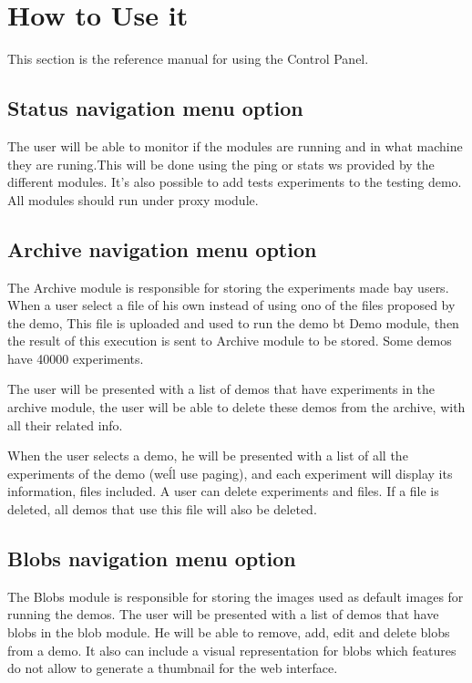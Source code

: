 \section{How to Use it}
This section is the reference manual for using the Control Panel.

\subsection{Status navigation menu option}
The user will be able to monitor if the modules are running and in what machine they are runing.This will be done using the ping or stats ws provided by the different modules.
It's also possible to add tests experiments to the testing demo.
All modules should run under proxy module.

\subsection{Archive navigation menu option}
The Archive module is responsible for storing the experiments made bay users. When a user select a file of his own instead of using ono of the files proposed by the demo, This file is uploaded and used to run the demo bt Demo module, then the result of this execution is sent to Archive module to be stored. Some demos have 40000 experiments.

The user will be presented with a list of demos that have experiments in the archive module, the user will be able to delete these demos from the archive, with all their related info.

When the user selects a demo, he will be presented with a list of all the experiments of the demo (we\'ll use paging), and each experiment will display its information, files included. A user can delete experiments and files. If a file is deleted, all demos that use this file will also be deleted.


\subsection{Blobs navigation menu option}
The Blobs module is responsible for storing the images used as default images for running the demos.
The user will be presented with a list of demos that have blobs in the blob module. He will be able to remove, add, edit and delete blobs from a demo. It also can include a visual representation for blobs which features do not allow to generate a thumbnail for the web interface. 


